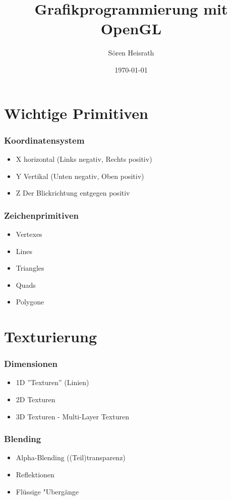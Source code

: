 \documentclass{beamer}
\title{Grafikprogrammierung mit OpenGL}
\author{S\"oren Heisrath}
\date{\today}
\begin{document}
\frame{\titlepage}

\section[\"Ubersicht]{}
\frame{\tableofcontents}

\section{Wichtige Primitiven}
\frame
{
	\frametitle{Koordinatensystem}
	\begin{itemize}
		\item X horizontal (Links negativ, Rechts positiv)
		\item Y Vertikal (Unten negativ, Oben positiv)
		\item Z Der Blickrichtung entgegen positiv
	\end{itemize}
}

\frame
{
	\frametitle{Zeichenprimitiven}
	\begin{itemize}
		\item Vertexes
		\item Lines
		\item Triangles
		\item Quads
		\item Polygone
	\end{itemize}
}

\section{Texturierung}
\frame
{
	\frametitle{Dimensionen}
	\begin{itemize}
		\item 1D ''Texturen'' (Linien)
		\item 2D Texturen
		\item 3D Texturen - Multi-Layer Texturen
	\end{itemize}
}

\frame
{
	\frametitle{Blending}
	\begin{itemize}
		\item Alpha-Blending ((Teil)transparenz)
		\item Reflektionen
		\item Fl\"ussige "Uberg\"ange
	\end{itemize}
}
\end{document}
